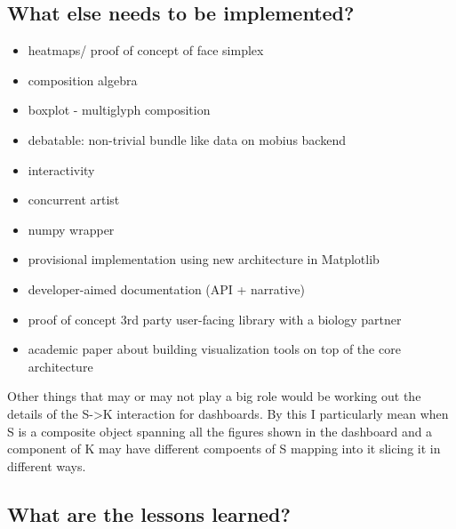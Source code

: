 \documentclass[../main.tex]{subfiles}
\begin{document}
\subsection{What else needs to be implemented?}
\begin{itemize}
    \item heatmaps/ proof of concept of face simplex
    \item composition algebra
    \item boxplot - multiglyph composition
    \item debatable: non-trivial bundle like data on mobius backend
    \item interactivity 
    \item concurrent artist
    \item numpy wrapper
\end{itemize}
\begin{itemize}
    \item provisional implementation using new architecture in Matplotlib
    \item developer-aimed documentation (API + narrative)
    \item proof of concept 3rd party user-facing library with a biology partner
    \item academic paper about building visualization tools on top of the core architecture
\end{itemize}

Other things that may or may not play a big role would be working out the details of the S->K interaction for dashboards. By this I particularly mean when S is a composite object spanning all the figures shown in the dashboard and a component of K may have different compoents of S mapping into it slicing it in different ways.
\subsection{What are the lessons learned?}
\end{document}
